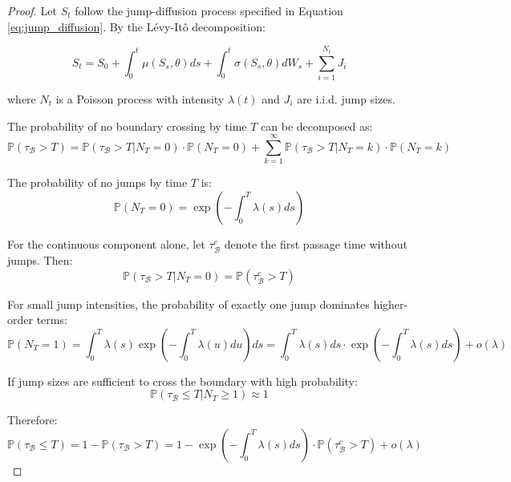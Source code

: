 \begin{proof}
Let $S_t$ follow the jump-diffusion process specified in Equation \ref{eq:jump_diffusion}. By the L\'evy-It\^o decomposition:

\begin{equation}
S_t = S_0 + \int_0^t \mu(S_s, \theta) ds + \int_0^t \sigma(S_s, \theta) dW_s + \sum_{i=1}^{N_t} J_i
\end{equation}

where $N_t$ is a Poisson process with intensity $\lambda(t)$ and $J_i$ are i.i.d. jump sizes.

The probability of no boundary crossing by time $T$ can be decomposed as:
\begin{equation}
\mathbb{P}(\tau_\mathcal{B} > T) = \mathbb{P}(\tau_\mathcal{B} > T | N_T = 0) \cdot \mathbb{P}(N_T = 0) + \sum_{k=1}^\infty \mathbb{P}(\tau_\mathcal{B} > T | N_T = k) \cdot \mathbb{P}(N_T = k)
\end{equation}

The probability of no jumps by time $T$ is:
\begin{equation}
\mathbb{P}(N_T = 0) = \exp\left(-\int_0^T \lambda(s) ds\right)
\end{equation}

For the continuous component alone, let $\tau_\mathcal{B}^c$ denote the first passage time without jumps. Then:
\begin{equation}
\mathbb{P}(\tau_\mathcal{B} > T | N_T = 0) = \mathbb{P}(\tau_\mathcal{B}^c > T)
\end{equation}

For small jump intensities, the probability of exactly one jump dominates higher-order terms:
\begin{equation}
\mathbb{P}(N_T = 1) = \int_0^T \lambda(s) \exp\left(-\int_0^T \lambda(u) du\right) ds = \int_0^T \lambda(s) ds \cdot \exp\left(-\int_0^T \lambda(s) ds\right) + o(\lambda)
\end{equation}

If jump sizes are sufficient to cross the boundary with high probability:
\begin{equation}
\mathbb{P}(\tau_\mathcal{B} \leq T | N_T \geq 1) \approx 1
\end{equation}

Therefore:
\begin{equation}
\mathbb{P}(\tau_\mathcal{B} \leq T) = 1 - \mathbb{P}(\tau_\mathcal{B} > T) = 1 - \exp\left(-\int_0^T \lambda(s) ds\right) \cdot \mathbb{P}(\tau_\mathcal{B}^c > T) + o(\lambda)
\end{equation}
\end{proof}


